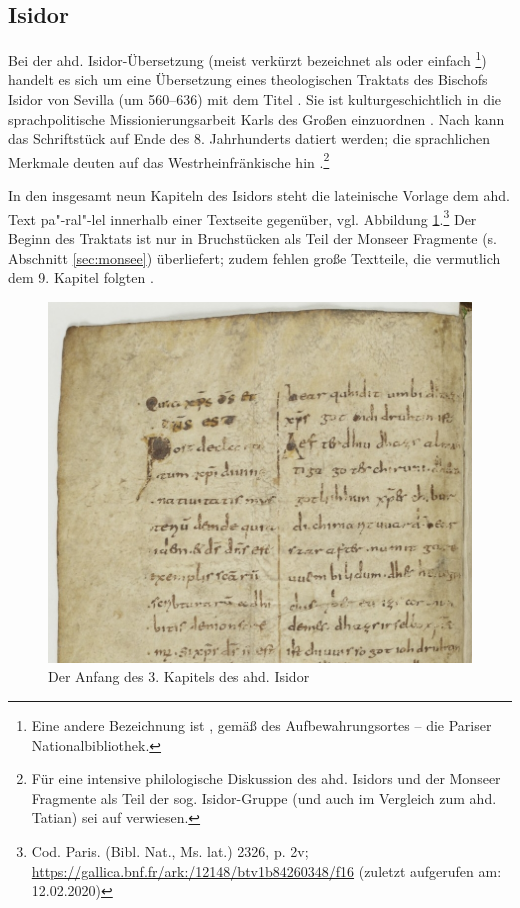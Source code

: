 \subsection{Isidor} \label{sec:isidor}

Bei der  ahd. Isidor-Übersetzung (meist verkürzt bezeichnet als  oder einfach \footnote{Eine andere Bezeichnung ist , gemäß des Aufbewahrungsortes -- die Pariser Nationalbibliothek.}) handelt es sich um eine Übersetzung eines theologischen Traktats des Bischofs Isidor von Sevilla (um 560--636) mit dem Titel . Sie ist kulturgeschichtlich in die sprachpolitische Missionierungsarbeit Karls des Großen einzuordnen \parencite[vgl.][36--38]{Schlachter2012}. Nach \textcite[VIII][]{Eggers1964} kann das Schriftstück auf Ende des 8. Jahrhunderts datiert werden; die sprachlichen Merkmale deuten auf das Westrheinfränkische hin \parencite{Matzel1970}.\footnote{Für eine intensive philologische Diskussion des ahd. Isidors und der Monseer Fragmente als Teil der sog. Isidor-Gruppe (und auch im Vergleich zum ahd. Tatian) sei auf \textcite[17--53]{Schlachter2012} verwiesen.} 

In den insgesamt neun Kapiteln des Isidors steht die lateinische Vorlage dem ahd. Text pa"-ral"-lel innerhalb einer Textseite gegenüber, vgl. Abbildung \ref{abb:isidor4}.\footnote{Cod. Paris. (Bibl. Nat., Ms. lat.) 2326, p. 2v; 
\url{https://gallica.bnf.fr/ark:/12148/btv1b84260348/f16} (zuletzt aufgerufen am: 12.02.2020)} Der Beginn des Traktats ist nur in Bruchstücken als Teil der Monseer Fragmente (s. Abschnitt \ref{sec:monsee}) überliefert; zudem fehlen große Textteile, die vermutlich dem 9. Kapitel folgten \parencite[25]{Schlachter2012}.

\begin{figure}[h]
\begin{center}
  \includegraphics[width=10 cm]{images/isidor-kap-3-ausschnitt.jpg}
  \caption {Der Anfang des 3. Kapitels des ahd. Isidor}
\label{abb:isidor4}
\end{center}
\end{figure} 

